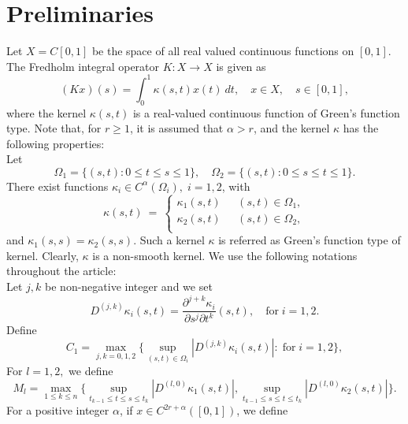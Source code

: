 \documentclass[sn-mathphys-num]{sn-jnl}%
\theoremstyle{thmstyleone}%
\theoremstyle{thmstyletwo}%
\theoremstyle{thmstylethree}%
\begin{document}
\section{Preliminaries}
Let $X=C[0,1]$ be the space of all real valued continuous functions on $[0,1]$. The Fredholm integral operator $K: X \to X$ is given as 
$$
(Kx)(s) = \int_{0}^{1} \kappa(s, t) x(t)~dt,  \quad x \in X, \quad s \in [0, 1],
$$
where the kernel $\kappa(s, t)$ is a real-valued continuous function of Green's function type.
Note that, for $r \ge 1$, it is assumed that $\alpha > r$, and the kernel $\kappa$ has the following properties:\\
Let 
$$
\Omega_1= \{(s,t) : 0\leq t\leq s\leq 1\}, \quad \Omega_2= \{(s,t) : 0\leq s\leq t\leq 1\}.
$$
There exist functions $\kappa_i \in C^\alpha(\Omega_i), \; i=1,2$, with 
\begin{equation*}
	\kappa(s,t) ~= ~
	\begin{cases}
		\kappa_1(s,t)    ~~~          & (s,t) \in \Omega_1,\\
		\kappa_2(s,t)    ~~~          & (s,t) \in \Omega_2,\\
	\end{cases} 
\end{equation*} 
and $\kappa_1(s,s)=\kappa_2(s,s).$ Such a kernel $\kappa$ is referred as Green's function type of kernel. Clearly, $\kappa$ is a non-smooth kernel. We use the following notations throughout the article:\\
Let $j, k$ be non-negative integer and we set
$$
D^{(j,k)}\kappa_i(s,t)=\frac{\partial^{j+k}\kappa_i}{\partial s^j \partial t ^k} (s,t), \quad \text{for} \; i=1,2.
$$
Define
\begin{equation*}
	C_1= \max_{j, k =0,1,2}\bigg \{ \sup_{ (s,t) \in \Omega_i} \left| D^{(j,k)} \kappa_i(s,t)\right| : \; \text{for}\; i=1, 2\bigg \},
\end{equation*}  
For  $l=1,2,$ we define
\begin{equation*}
	M_l = \max_{1 \le k \le n}\bigg \{ \sup_{t_{k-1} \le t \le s \le t_k} \left| D^{(l,0)} \kappa_1(s,t)\right|, \sup_{t_{k-1} \le  s \le t \le t_k} \left| D^{(l,0)} \kappa_2(s,t)\right| \bigg \}.
\end{equation*} 
For a positive integer $\alpha$, if $x \in C^{2r+\alpha}([0,1])$, we define
\end{document}
